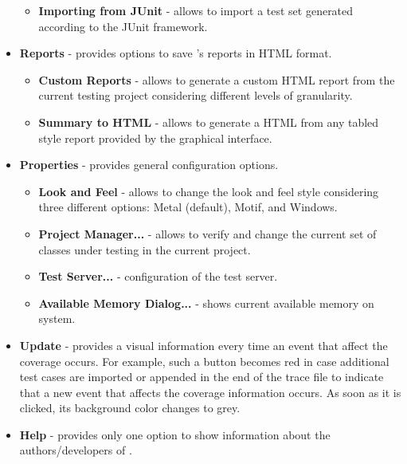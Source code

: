 \begin{itemize}
\begin{itemize}

            \item \textbf{Importing from JUnit} - allows to import a test set
            generated according to the JUnit framework.
        \end{itemize}

    \item \textbf{Reports} - provides options to save \toolname's reports in
    HTML format.
        \begin{itemize}
            \item \textbf{Custom Reports} - allows to generate a custom
            HTML report from the current testing project considering different
            levels of granularity.

            \item \textbf{Summary to HTML} - allows to generate a HTML from
            any tabled style report provided by the \toolname graphical interface.
        \end{itemize}

    \item \textbf{Properties} - provides general configuration options.
        \begin{itemize}
            \item \textbf{Look and Feel} - allows to change the
            look and feel style considering three different options:
            Metal (default), Motif, and Windows.

            \item \textbf{Project Manager...} - allows to verify and change
            the current set of classes under testing in the current project.
            
            \item \textbf{Test Server...} - configuration of the test server.
            
            \item \textbf{Available Memory Dialog...} - shows current available
            memory on system.
        \end{itemize}

    \item \textbf{Update} - provides a visual information every time an
    event that affect the coverage occurs. For example, such a button becomes
    red in case additional test cases are imported or appended in the end of the
    trace file to indicate that a new event that affects the coverage information
    occurs. As soon as it is clicked, its background color changes
    to grey.

    \item \textbf{Help} - provides only one option to show information
    about the authors/developers of \toolname.
\end{itemize}


